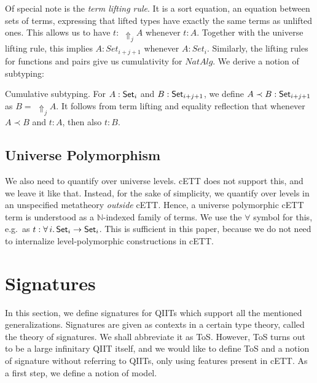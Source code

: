 \documentclass{llncs}
\newcommand{\Lift}{\Uparrow}
\begin{document}
Of special note is the \emph{term lifting rule}. It is a sort equation, an
equation between sets of terms, expressing that lifted types have exactly the
same terms as unlifted ones. This allows us to have $t :\,\,\Lift_j A$ whenever $t
: A$. Together with the universe lifting rule, this implies $A : Set_{i+j+1}$
whenever $A : Set_i$. Similarly, the lifting rules for functions and pairs give
us cumulativity for $NatAlg$. We derive a notion of subtyping:

\begin{nidefinition}{Cumulative subtyping.}
  For $A : \mathsf{Set}_i$ and $B : \mathsf{Set}_{i+j+1}$, we define $A \prec B : \mathsf{Set}_{i+j+1}$
  as $B =\,\,\Lift_j A$.  It follows from term lifting and equality reflection
  that whenever $A \prec B$ and $t : A$, then also $t : B$.
\end{nidefinition}

\subsection{Universe Polymorphism}
\label{sec:universe_polymorphism}

We also need to quantify over universe levels. cETT does not support this, and
we leave it like that. Instead, for the sake of simplicity, we quantify over
levels in an unspecified metatheory \emph{outside} cETT. Hence, a universe
polymorphic cETT term is understood as a $\mathbb{N}$-indexed family of
terms. We use the $\forall$ symbol for this, e.g.\ as $t : \forall\,i.\,\mathsf{Set}_i \rightarrow
\mathsf{Set}_i$. This is sufficient in this paper, because we do not need to internalize
level-polymorphic constructions in cETT.

\section{Signatures}
\label{sec:tos}

In this section, we define signatures for QIITs which support all the mentioned
generalizations. Signatures are given as contexts in a certain type theory,
called the theory of signatures. We shall abbreviate it as ToS. However, ToS
turns out to be a large infinitary QIIT itself, and we would like to define ToS
and a notion of signature without referring to QIITs, only using features
present in cETT. As a first step, we define a notion of model.
\end{document}
